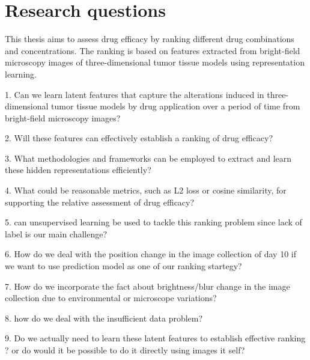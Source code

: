 \chapter{Research questions}\label{ch:Research questions}
This thesis aims to assess drug efficacy by ranking different drug combinations and concentrations. 
The ranking is based on features extracted from bright-field microscopy images of  three-dimensional tumor tissue models using
representation learning. 

1. Can we learn latent features that capture the alterations 
induced in three-dimensional tumor tissue models by drug application over a period of time from bright-field microscopy images?

2.  Will these features can effectively establish a ranking of drug efficacy?

3. What methodologies and frameworks can be employed to extract and learn these
 hidden representations efficiently?

4. What could be reasonable metrics, such as L2 loss or cosine similarity, for 
supporting the relative assessment of drug efficacy?

5. can unsupervised learning be used to tackle this ranking problem since lack of label is 
our main challenge?

6. How do we deal with the position change in the image collection of day 10 if we want to use prediction 
model as one of our ranking startegy?

7. How do we incorporate the fact about brightness/blur change in the image collection due to environmental or microscope 
variations?

8. how do we deal with the insufficient data problem?

9. Do we actually need to learn these latent features to establish effective ranking ? or do would it be possible to do it directly using images it self?
